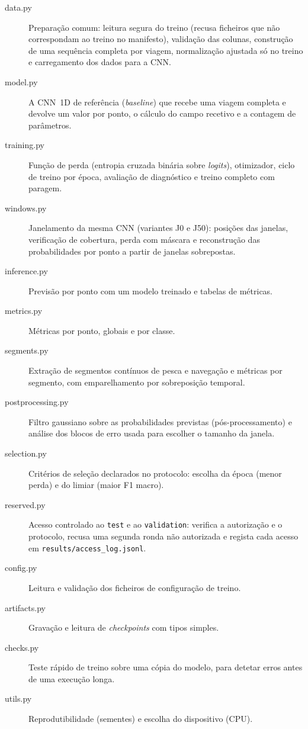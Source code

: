 \documentclass[11pt,a4paper]{article}
\newcommand{\f}[1]{\texttt{#1}}
\begin{document}
\begin{description}
\item[data.py] Preparação comum: leitura segura do treino (recusa ficheiros que não correspondam ao
  treino no manifesto), validação das colunas, construção de uma sequência completa por viagem,
  normalização ajustada só no treino e carregamento dos dados para a CNN.
\item[model.py] A CNN~1D de referência (\emph{baseline}) que recebe uma viagem completa e devolve
  um valor por ponto, o cálculo do campo recetivo e a contagem de parâmetros.
\item[training.py] Função de perda (entropia cruzada binária sobre \emph{logits}), otimizador,
  ciclo de treino por época, avaliação de diagnóstico e treino completo com paragem.
\item[windows.py] Janelamento da mesma CNN (variantes J0 e J50): posições das janelas,
  verificação de cobertura, perda com máscara e reconstrução das probabilidades por ponto a partir
  de janelas sobrepostas.
\item[inference.py] Previsão por ponto com um modelo treinado e tabelas de métricas.
\item[metrics.py] Métricas por ponto, globais e por classe.
\item[segments.py] Extração de segmentos contínuos de pesca e navegação e métricas por segmento,
  com emparelhamento por sobreposição temporal.
\item[postprocessing.py] Filtro gaussiano sobre as probabilidades previstas (pós-processamento) e
  análise dos blocos de erro usada para escolher o tamanho da janela.
\item[selection.py] Critérios de seleção declarados no protocolo: escolha da época (menor perda) e
  do limiar (maior F1 macro).
\item[reserved.py] Acesso controlado ao \f{test} e ao \f{validation}: verifica a autorização e o
  protocolo, recusa uma segunda ronda não autorizada e regista cada acesso em
  \f{results/access\_log.jsonl}.
\item[config.py] Leitura e validação dos ficheiros de configuração de treino.
\item[artifacts.py] Gravação e leitura de \emph{checkpoints} com tipos simples.
\item[checks.py] Teste rápido de treino sobre uma cópia do modelo, para detetar erros antes de uma
  execução longa.
\item[utils.py] Reprodutibilidade (sementes) e escolha do dispositivo (CPU).
\end{description}
\end{document}
